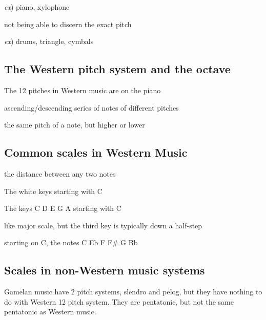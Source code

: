 \documentclass[
  12pt,
]{article}
\providecommand{\tightlist}{%
  \setlength{\itemsep}{0pt}\setlength{\parskip}{0pt}}
\begin{document}
\emph{ex}) piano, xylophone

\begin{description}
\tightlist
\item[indeterminant pitch]
not being able to discern the exact pitch
\end{description}

\emph{ex}) drums, triangle, cymbals

\subsection{The Western pitch system and the octave}\label{the-western-pitch-system-and-the-octave}

The 12 pitches in Western music are on the piano

\begin{description}
\tightlist
\item[scale]
ascending/descending series of notes of different pitches
\item[octave]
the same pitch of a note, but higher or lower
\end{description}

\subsection{Common scales in Western Music}\label{common-scales-in-western-music}

\begin{description}
\tightlist
\item[interval]
the distance between any two notes
\item[\emph{\textbf{Major Scale}}]
The white keys starting with C
\item[\emph{\textbf{Pentatonic Scale}}]
The keys C D E G A starting with C
\item[\emph{\textbf{Minor Scale}}]
like major scale, but the third key is typically down a half-step
\item[\emph{\textbf{Blues Scale}}]
starting on C, the notes C Eb F F\# G Bb
\end{description}

\subsection{Scales in non-Western music systems}\label{scales-in-non-western-music-systems}

Gamelan music have 2 pitch systems, slendro and pelog, but they have nothing to do with Western 12 pitch system. They are pentatonic, but not the same pentatonic as Western music.
\end{document}
